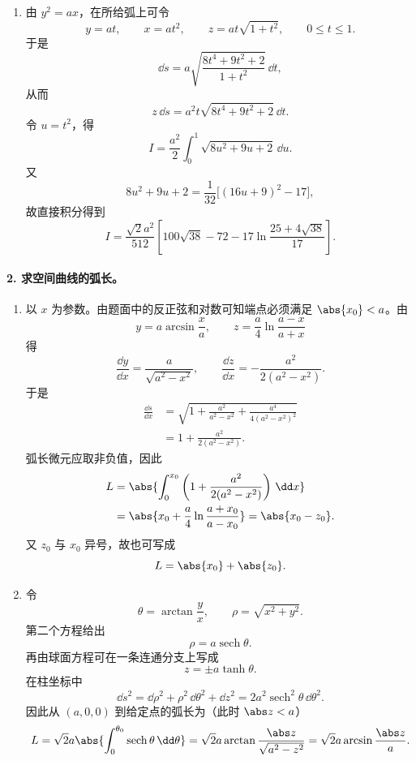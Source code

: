 \begin{xsolution}
\begin{enumerate}[label=(\arabic*)]
\item 由 $y^2=ax$，在所给弧上可令
\[
  y=at,\qquad x=at^2,\qquad
  z=at\sqrt{1+t^2},\qquad 0\le t\le1.
\]
于是
\[
  \dd s
  =a\sqrt{\frac{8t^4+9t^2+2}{1+t^2}}\,\dd t,
\]
从而
\[
  z\,\dd s=a^2t\sqrt{8t^4+9t^2+2}\,\dd t.
\]
令 $u=t^2$，得
\[
  I=\frac{a^2}{2}\int_0^1\sqrt{8u^2+9u+2}\,\dd u.
\]
又
\[
  8u^2+9u+2=\frac1{32}\bigl[(16u+9)^2-17\bigr],
\]
故直接积分得到
\[
  I=\frac{\sqrt2a^2}{512}
  \left[
    100\sqrt{38}-72
    -17\ln\frac{25+4\sqrt{38}}{17}
  \right].
\]
\end{enumerate}
\end{xsolution}

\paragraph{2. 求空间曲线的弧长。}
\begin{xsolution}
\begin{enumerate}[label=(\arabic*)]
\item 以 $x$ 为参数。由题面中的反正弦和对数可知端点必须满足 $\abs{x_0}<a$。由
\[
  y=a\arcsin\frac xa,
  \qquad
  z=\frac a4\ln\frac{a-x}{a+x}
\]
得
\[
  \frac{\dd y}{\dd x}=\frac{a}{\sqrt{a^2-x^2}},
  \qquad
  \frac{\dd z}{\dd x}=-\frac{a^2}{2(a^2-x^2)}.
\]
于是
\begin{align*}
  \frac{\dd s}{\dd x}
  &=\sqrt{1+\frac{a^2}{a^2-x^2}
      +\frac{a^4}{4(a^2-x^2)^2}}\\
  &=1+\frac{a^2}{2(a^2-x^2)}.
\end{align*}
弧长微元应取非负值，因此
\begin{align*}
  L
  &=\abs{\int_0^{x_0}\left(1+\frac{a^2}{2(a^2-x^2)}\right)\,\dd x}\\
  &=\abs{x_0+\frac a4\ln\frac{a+x_0}{a-x_0}}
   =\abs{x_0-z_0}.
\end{align*}
又 $z_0$ 与 $x_0$ 异号，故也可写成
\[
  L=\abs{x_0}+\abs{z_0}.
\]

\item 令
\[
  \theta=\arctan\frac yx,
  \qquad \rho=\sqrt{x^2+y^2}.
\]
第二个方程给出
\[
  \rho=a\operatorname{sech}\theta.
\]
再由球面方程可在一条连通分支上写成
\[
  z=\pm a\tanh\theta.
\]
在柱坐标中
\[
  \dd s^2=\dd\rho^2+\rho^2\,\dd\theta^2+\dd z^2
  =2a^2\operatorname{sech}^2\theta\,\dd\theta^2.
\]
因此从 $(a,0,0)$ 到给定点的弧长为（此时 $\abs z<a$）
\[
  L=\sqrt2a\abs{\int_0^{\theta_0}\operatorname{sech}\theta\,\dd\theta}
  =\sqrt2a\arctan\frac{\abs z}{\sqrt{a^2-z^2}}
  =\sqrt2a\arcsin\frac{\abs z}{a}.
\]
\end{enumerate}
\end{xsolution}

